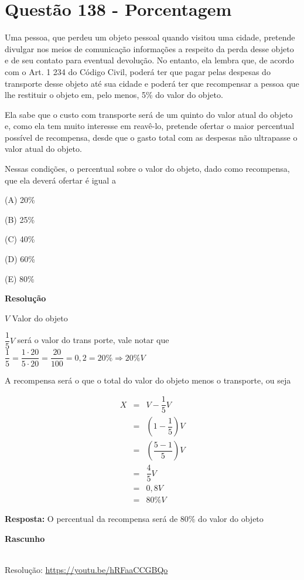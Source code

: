 \section{Questão 138 - Porcentagem}

Uma pessoa, que perdeu um objeto pessoal quando visitou uma cidade, pretende divulgar nos meios de comunicação informações a respeito da perda desse objeto e de seu contato para eventual devolução. 
No entanto, ela lembra que, de acordo com o Art. 1 234 do Código Civil, poderá ter que pagar pelas despesas do transporte desse objeto até sua cidade e poderá ter que recompensar a pessoa que lhe restituir o objeto em, pelo menos, 5\% do valor do objeto. 

Ela sabe que o custo com transporte será de um quinto do valor atual do objeto e, como ela tem muito interesse em reavê-lo, pretende ofertar o maior percentual possível de recompensa, desde que o gasto total com as despesas não ultrapasse o valor atual do objeto.

Nessas condições, o percentual sobre o valor do objeto, dado como recompensa, que ela deverá ofertar é igual a

(A) 20\%

(B) 25\%

(C) 40\%

(D) 60\%

(E) 80\%

\textbf{Resolução}

$ V $ Valor do objeto

$ \dfrac{1}{5}V $ será o valor do trans porte, vale notar que $ \dfrac{1}{5} =  \dfrac{1 \cdot 20}{5 \cdot 20} = \dfrac{20}{100} = 0,2 = 20\% \Rightarrow 20\%V $

A recompensa será o que o total do valor do objeto menos o transporte, ou seja


\begin{eqnarray*}
    X &=& V - \dfrac{1}{5}V \\
      &=& \left(1 - \dfrac{1}{5}\right)V \\
      &=& \left(\dfrac{5 - 1}{5}\right)V \\
      &=& \dfrac{4}{5}V \\
      &=& 0,8V \\
      &=& 80\%V 
\end{eqnarray*}

\textbf{Resposta:} O percentual da recompensa será de 80\% do valor do objeto

\textbf{Rascunho}



\begin{center}
    \href{https://youtu.be/hRFaaCCGBQo}{
    }\\
    Resolução: \url{https://youtu.be/hRFaaCCGBQo}
\end{center}
